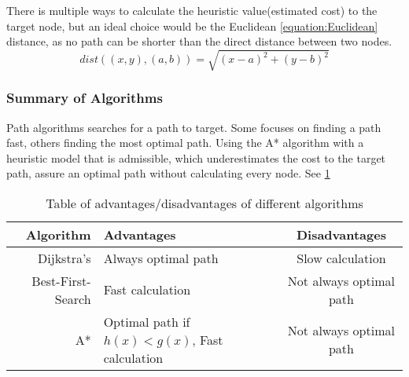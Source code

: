   There is multiple ways to calculate the heuristic value(estimated cost) to the target node, but an ideal choice would be the Euclidean \ref{equation:Euclidean}  distance, as no path can be shorter than the direct distance between two nodes.
  \begin{equation} \label{equation:Euclidean}
    dist((x, y), (a, b)) = \sqrt{(x - a)^2 + (y - b)^2}
  \end{equation}

  \subsubsection{Summary of Algorithms}

  Path algorithms searches for a path to target. Some focuses on finding a path fast, others finding the most optimal path. Using the A* algorithm with a heuristic model that is admissible, which underestimates the cost to the target path, assure an optimal path without calculating every node. See \cref{tbl:scheme}
  
  \begin{table}[ht!]
    \centering
    \begin{tabular}{|r|l|c|}
      \hline
      \textbf{Algorithm} & \textbf{Advantages} & \textbf{Disadvantages} \\
      \hline
      Dijkstra's & Always optimal path & Slow calculation \\
      Best-First-Search & Fast calculation & Not always optimal path \\
      A* & Optimal path if $h(x)<g(x)$, Fast calculation & Not always optimal path \\
      \hline
    \end{tabular}
    \caption{Table of advantages/disadvantages of different algorithms}
    \label{tbl:scheme}
  \end{table}